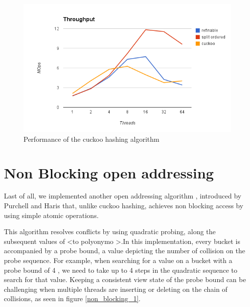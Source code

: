 \begin{figure}
 \centering
  \includegraphics[scale=0.5]{hashes_cuckoo_perf.png}
\caption{Performance of the cuckoo hashing algorithm}
\label{hashes_cuckoo_perf}
\end{figure}

\section{Non Blocking  open addressing}

Last of all, we implemented another open addressing algorithm , introduced by Purchell and Haris \cite{non_blocking_open_addressing} that, unlike cuckoo hashing,  achieves non blocking access by using simple atomic operations.

This algorithm resolves conflicts by using quadratic probing, along the subsequent values of <to polyonymo >.In this implementation, every bucket is accompanied by a probe bound, a value depicting the number of collision on the probe sequence. For example, when searching for a value on a bucket with a probe bound of 4 , we need to take up to 4 steps in the quadratic sequence to search for that value. Keeping a consistent view state of the probe bound can be challenging when multiple threads are inserting or deleting on the chain of collisions, as seen in figure \ref{non_blocking_1}.

